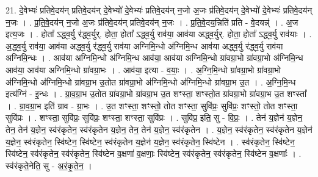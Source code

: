 \documentclass[17pt]{extarticle}
\begin{document}
21. दे॒वेभ्यः॑ प्रतिवे॒दय॑न् प्रतिवे॒दय॑न् दे॒वेभ्यो॑ दे॒वेभ्यः॑ प्रतिवे॒दय॑न् न॒जो अ॒जः प्र॑तिवे॒दय॑न् दे॒वेभ्यो॑ दे॒वेभ्यः॑ प्रतिवे॒दय॑न् न॒जः । . प्र॒ति॒वे॒दय॑न् न॒जो अ॒जः प्र॑तिवे॒दय॑न् प्रतिवे॒दय॑न् न॒जः । . प्र॒ति॒वे॒दय॒न्निति॑ प्रति - वे॒दयन्न्॑ । . अ॒ज इत्य॒जः । . होता᳚ ऽद्ध्व॒र्यु र॑द्ध्व॒र्युर्. होता॒ होता᳚ ऽद्ध्व॒र्यु राव॑या॒ आव॑या अद्ध्व॒र्युर्. होता॒ होता᳚ ऽद्ध्व॒र्यु राव॑याः । . अ॒द्ध्व॒र्यु राव॑या॒ आव॑या अद्ध्व॒र्यु र॑द्ध्व॒र्यु राव॑या अग्निमि॒न्धो अ॑ग्निमि॒न्ध आव॑या अद्ध्व॒र्यु र॑द्ध्व॒र्यु राव॑या अग्निमि॒न्धः । . आव॑या अग्निमि॒न्धो अ॑ग्निमि॒न्ध आव॑या॒ आव॑या अग्निमि॒न्धो ग्रा॑वग्रा॒भो ग्रा॑वग्रा॒भो अ॑ग्निमि॒न्ध आव॑या॒ आव॑या अग्निमि॒न्धो ग्रा॑वग्रा॒भः । . आव॑या॒ इत्या - व॒याः॒ । . अ॒ग्नि॒मि॒न्धो ग्रा॑वग्रा॒भो ग्रा॑वग्रा॒भो अ॑ग्निमि॒न्धो अ॑ग्निमि॒न्धो ग्रा॑वग्रा॒भ उ॒तोत ग्रा॑वग्रा॒भो 
अ॑ग्निमि॒न्धो अ॑ग्निमि॒न्धो ग्रा॑वग्रा॒भ उ॒त । . अ॒ग्नि॒मि॒न्ध इत्य॑ग्निं - इ॒न्धः । . ग्रा॒व॒ग्रा॒भ उ॒तोत ग्रा॑वग्रा॒भो ग्रा॑वग्रा॒भ उ॒त शꣳस्ता॒ शꣳस्तो॒त ग्रा॑वग्रा॒भो ग्रा॑वग्रा॒भ उ॒त शꣳस्ता᳚ । . ग्रा॒व॒ग्रा॒भ इति॑ ग्राव - ग्रा॒भः । . उ॒त शꣳस्ता॒ शꣳस्तो॒ तोत शꣳस्ता॒ सुवि॑प्रः॒ सुवि॑प्रः॒ शꣳस्तो॒ तोत शꣳस्ता॒ सुवि॑प्रः । . शꣳस्ता॒ सुवि॑प्रः॒ सुवि॑प्रः॒ शꣳस्ता॒ शꣳस्ता॒ सुवि॑प्रः । . सुवि॑प्र॒ इति॒ सु - वि॒प्रः॒ । . तेन॑ य॒ज्ञेन॑ य॒ज्ञेन॒ तेन॒ तेन॑ य॒ज्ञेन॒ स्व॑रंकृतेन॒ स्व॑रंकृतेन य॒ज्ञेन॒ तेन॒ तेन॑ य॒ज्ञेन॒ स्व॑रंकृतेन । . य॒ज्ञेन॒ स्व॑रंकृतेन॒ स्व॑रंकृतेन य॒ज्ञेन॑ य॒ज्ञेन॒ स्व॑रंकृतेन॒ स्वि॑ष्टेन॒ स्वि॑ष्टेन॒ स्व॑रंकृतेन य॒ज्ञेन॑ य॒ज्ञेन॒ स्व॑रंकृतेन॒ स्वि॑ष्टेन । . स्व॑रंकृतेन॒ स्वि॑ष्टेन॒ स्वि॑ष्टेन॒ स्व॑रंकृतेन॒ स्व॑रंकृतेन॒ स्वि॑ष्टेन व॒क्षणा॑ व॒क्षणाः॒ स्वि॑ष्टेन॒ स्व॑रंकृतेन॒ स्व॑रंकृतेन॒ स्वि॑ष्टेन व॒क्षणाः᳚ । . स्व॑रंकृते॒नेति॒ सु - अ॒रं॒कृ॒ते॒न॒ । \newline
\end{document}
